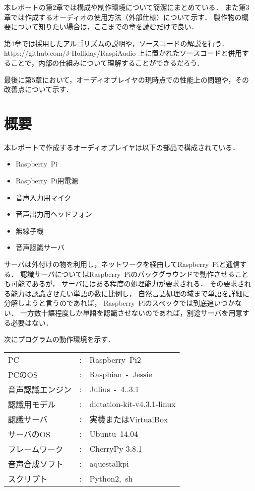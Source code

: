 \documentclass{jsarticle}
\begin{document}
\begin{multicols}{2}
本レポートの第2章では構成や制作環境について簡潔にまとめている．
また第3章では作成するオーディオの使用方法（外部仕様）について示す．
製作物の概要について知りたい場合は，ここまでの章を読むだけで良い．

第4章では採用したアルゴリズムの説明や，ソースコードの解説を行う．
https://github.com/J-Holliday/RaspiAudio
上に置かれたソースコードと併用することで，内部の仕組みについて理解することができるだろう．

最後に第5章において，オーディオプレイヤの現時点での性能上の問題や，その改善点について示す．

\newpage

\section{概要}
\label{sec:概要}
\label{概要}

本レポートで作成するオーディオプレイヤは以下の部品で構成されている．
\begin{itemize}
\item Raspberry\ Pi
\item Raspberry\ Pi用電源
\item 音声入力用マイク
\item 音声出力用ヘッドフォン
\item 無線子機
\item 音声認識サーバ
\end{itemize}

サーバは外付けの物を利用し，ネットワークを経由してRaspberry\ Piと通信する．
認識サーバについてはRaspberry\ Piのバックグラウンドで動作させることも可能であるが，
サーバにはある程度の処理能力が要求される．
その要求される能力は認識させたい単語の数に比例し，
自然言語処理の域まで単語を詳細に分解しようと言うのであれば，
Raspberry\ Piのスペックでは到底追いつかない．
一方数十語程度しか単語を認識させないのであれば，別途サーバを用意する必要はない．

次にプログラムの動作環境を示す．
\newline \\ 
\begin{tabular}{lcl}
\centering
PC & : & Raspberry\ Pi2 \\
PCのOS & : & Raspbian\ -\ Jessie \\
音声認識エンジン & : & Julius\ -\ 4..3.1 \\
認識用モデル & : & dictation-kit-v4.3.1-linux \\
認識サーバ & : & 実機またはVirtualBox \\
サーバのOS & : & Ubuntu\ 14.04 \\
フレームワーク & : & CherryPy-3.8.1 \\
音声合成ソフト & : & aquestalkpi \\
スクリプト & : & Python2,\ sh \\
\end{tabular}
\newline


\end{multicols}
\end{document}
